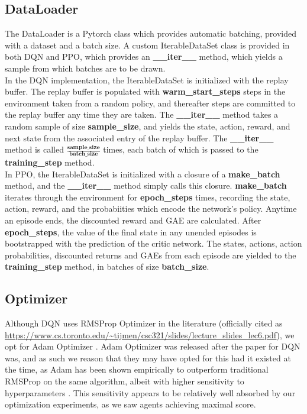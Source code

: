 \documentclass[12pt]{article}
\begin{document}
\subsection{DataLoader}
The DataLoader is a Pytorch class which provides automatic batching, provided with a dataset and a batch size. A custom IterableDataSet class is provided in both DQN and PPO, which provides an \textbf{\_\_iter\_\_} method, which yields a sample from which batches are to be drawn. \\\newline
In the DQN implementation, the IterableDataSet is initialized with the replay buffer. The replay buffer is populated with \textbf{warm\_start\_steps} steps in the environment taken from a random policy, and thereafter steps are committed to the replay buffer any time they are taken. The \textbf{\_\_iter\_\_} method takes a random sample of size \textbf{sample\_size}, and yields the state, action, reward, and next state from the associated entry of the replay buffer. The \textbf{\_\_iter\_\_} method is called $\frac{\textbf{sample\_size}}{\textbf{batch\_size}}$ times, each batch of which is passed to the \textbf{training\_step} method. \\\newline
In PPO, the IterableDataSet is initialized with a closure of a \textbf{make\_batch} method, and the \textbf{\_\_iter\_\_} method simply calls this closure. \textbf{make\_batch} iterates through the environment for \textbf{epoch\_steps} times, recording the state, action, reward, and the probabiities which encode the network's policy. Anytime an episode ends, the discounted reward and GAE are calculated. After \textbf{epoch\_steps}, the value of the final state in any unended episodes is bootstrapped with the prediction of the critic network. The states, actions, action probabilities, discounted returns and GAEs from each episode are yielded to the \textbf{training\_step} method, in batches of size \textbf{batch\_size}. 
\subsection{Optimizer}
Although DQN uses RMSProp Optimizer in the literature (officially cited as \url{https://www.cs.toronto.edu/~tijmen/csc321/slides/lecture_slides_lec6.pdf}), we opt for Adam Optimizer \autocite{adam}. Adam Optimizer was released after the paper for DQN was, and as such we reason that they may have opted for this had it existed at the time, as Adam has been shown empirically to outperform traditional RMSProp on the same algorithm, albeit with higher sensitivity to hyperparameters \autocite{DBLP:journals/corr/abs-1810-02525}. This sensitivity appears to be relatively well absorbed by our optimization experiments, as we saw agents achieving maximal score.
\end{document}
